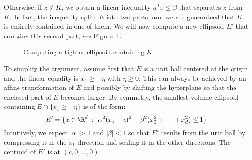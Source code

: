Otherwise, if $z \not\in K$,
we obtain a linear inequality $a^Tx \leq \beta$ that separates $z$ from $K$.
In fact, the inequality splits $E$ into two parts,
and we are guaranteed that $K$ is entirely contained in one of them.
We will now compute a new ellipsoid $E'$ that contains this second part,
see Figure~\ref{fig:ellipsoid-method}.
\begin{figure}
  \begin{center}
  \end{center}
  \caption{Computing a tighter ellipsoid containing $K$.}
  \label{fig:ellipsoid-method}
\end{figure}

To simplify the argument,
assume first that $E$ is a unit ball centered at the origin
and the linear equality is $x_1 \geq -\eta$ with $\eta \geq 0$.
This can always be achieved by an affine transformation of $E$ and possibly by shifting the hyperplane
so that the enclosed part of $E$ becomes larger.
By symmetry, the smallest volume ellipsoid containing $E \cap \{ x_1 \geq -\eta \}$ is of the form:
\[
  E' = \{ x \in \R^d ~:~ \alpha^2 (x_1 - c)^2 + \beta^2 (x_2^2 + \dots + x_d^2) \leq 1 \}
\]
Intuitively, we expect $|\alpha| > 1$ and $|\beta| < 1$ so that $E'$ results from the unit ball
by compressing it in the $x_1$ direction and scaling it in the other directions.
The centroid of $E'$ is at $(c,0,\ldots,0)$.

